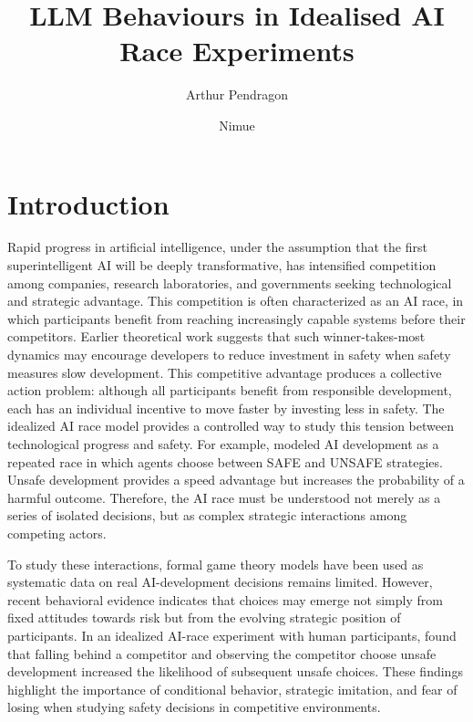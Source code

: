 \documentclass[sigconf,anonymous]{aamas}
\title[AAMAS-2026 Formatting Instructions]{LLM Behaviours in Idealised AI Race Experiments}
\author{Arthur Pendragon}
\affiliation{
  \institution{Camelot Castle}
  \city{Camelot}
  \country{United Kingdom}}
\author{Nimue}
\affiliation{
  \institution{The Lady's Lake}
  \city{Avalon}
  \country{United Kingdom}}
\begin{document}

\pagestyle{fancy}
\fancyhead{}


\maketitle 


\section{Introduction}
Rapid progress in artificial intelligence, under the assumption that the first superintelligent AI will be deeply transformative, has intensified competition among companies, research laboratories, and governments seeking technological and strategic advantage. This competition is often characterized as an AI race, in which participants benefit from reaching increasingly capable systems before their competitors. Earlier theoretical work suggests that such winner-takes-most dynamics may encourage developers to reduce investment in safety when safety measures slow development.\cite{racing_to_the_precipice} This competitive advantage produces a collective action problem: although all participants benefit from responsible development, each has an individual incentive to move faster by investing less in safety.\cite{role_of_Cooperation}
The idealized AI race model provides a controlled way to study this tension between technological progress and safety. For example, \citet{to_regulate_or_not} modeled AI development as a repeated race in which agents choose between SAFE and UNSAFE strategies. Unsafe development provides a speed advantage but increases the probability of a harmful outcome. Therefore, the AI race must be understood not merely as a series of isolated decisions, but as complex strategic interactions among competing actors. 

To study these interactions, formal game theory models have been used as systematic data on real AI-development decisions remains limited. However, recent behavioral evidence indicates that choices may emerge not simply from fixed attitudes towards risk but from the evolving strategic position of participants. In an idealized AI-race experiment with human participants, \citet{falling_behind_unsafe} found that falling behind a competitor and observing the competitor choose unsafe development increased the likelihood of subsequent unsafe choices. These findings highlight the importance of conditional behavior, strategic imitation, and fear of losing when studying safety decisions in competitive environments. 
\end{document}

